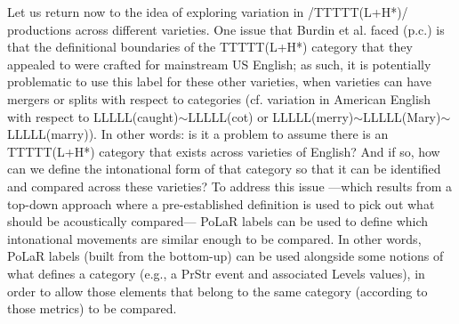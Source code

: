 \documentclass[11pt, twoside]{memoir}
\begin{document}
Let us return now to the idea of exploring variation in /TTTTT(L+H*)/ productions across different varieties. One issue that Burdin et al. faced (p.c.) is that the definitional boundaries of the TTTTT(L+H*) category that they appealed to were crafted for mainstream US English; as such, it is potentially problematic to use this label for these other varieties, when varieties can have mergers or splits with respect to categories (cf. variation in American English with respect to LLLLL(caught)$\sim$LLLLL(cot) or LLLLL(merry)$\sim$LLLLL(Mary)$\sim$LLLLL(marry)). In other words: is it a problem to assume there is an TTTTT(L+H*) category that exists across varieties of English? And if so, how can we define the intonational form of that category so that it can be identified and compared across these varieties? To address this issue —which results from a top-down approach where a pre-established definition is used to pick out what should be acoustically compared— PoLaR labels can be used to define which intonational movements are similar enough to be compared. In other words, PoLaR labels (built from the bottom-up) can be used alongside some notions of what defines a category (e.g., a PrStr event and associated Levels values), in order to allow those elements that belong to the same category (according to those metrics) to be compared.
\end{document}
